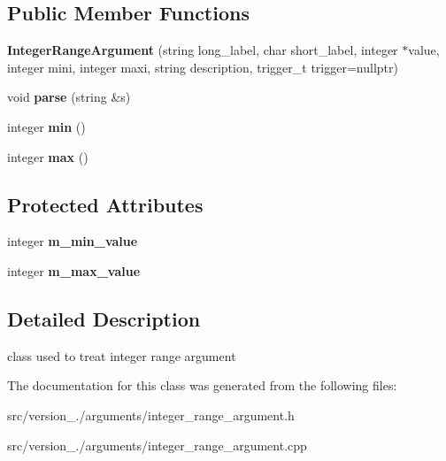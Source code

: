 \subsection*{Public Member Functions}
\begin{DoxyCompactItemize}
\item 
\mbox{\label{classez_1_1arguments_1_1IntegerRangeArgument_aca1a6753aeff2e3acd4e8c8899de790b}} 
{\bfseries Integer\+Range\+Argument} (string long\+\_\+label, char short\+\_\+label, integer $\ast$value, integer mini, integer maxi, string description, trigger\+\_\+t trigger=nullptr)
\item 
\mbox{\label{classez_1_1arguments_1_1IntegerRangeArgument_ac167a406461c11e1076c8e703a516bac}} 
void {\bfseries parse} (string \&s)
\item 
\mbox{\label{classez_1_1arguments_1_1IntegerRangeArgument_a74cbc2ba7fb0c7fef92b1a02d7a0c8dc}} 
integer {\bfseries min} ()
\item 
\mbox{\label{classez_1_1arguments_1_1IntegerRangeArgument_ad47993387de8e32bf9555241d2781be2}} 
integer {\bfseries max} ()
\end{DoxyCompactItemize}
\subsection*{Protected Attributes}
\begin{DoxyCompactItemize}
\item 
\mbox{\label{classez_1_1arguments_1_1IntegerRangeArgument_a40b579d4c4d7e112b5a881e35b01a858}} 
integer {\bfseries m\+\_\+min\+\_\+value}
\item 
\mbox{\label{classez_1_1arguments_1_1IntegerRangeArgument_a2812cb927573632aafa2fd65379ef741}} 
integer {\bfseries m\+\_\+max\+\_\+value}
\end{DoxyCompactItemize}


\subsection{Detailed Description}
class used to treat integer range argument 

The documentation for this class was generated from the following files\+:\begin{DoxyCompactItemize}
\item 
src/version\+\_./arguments/integer\+\_\+range\+\_\+argument.\+h\item 
src/version\+\_./arguments/integer\+\_\+range\+\_\+argument.\+cpp\end{DoxyCompactItemize}
